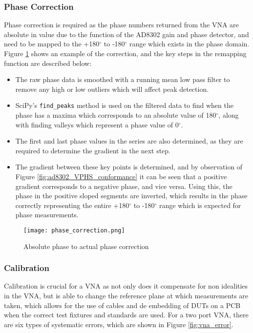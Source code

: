 \subsubsection{Phase Correction}
Phase correction is required as the phase numbers returned from the VNA are absolute in value due to the function of the AD8302 gain and phase detector, and need to be mapped to the +180$^\circ$ to -180$^\circ$ range which exists in the phase domain. Figure \ref{fig:phase_correction} shows an example of the correction, and the key steps in the remapping function are described below:
\begin{itemize}
	\item The raw phase data is smoothed with a running mean low pass filter to remove any high or low outliers which will affect peak detection.
	\item SciPy's \texttt{find\_peaks} method is used on the filtered data to find when the phase has a maxima which corresponds to an absolute value of 180$^\circ$, along with finding valleys which represent a phase value of 0$^\circ$.
	\item The first and last phase values in the series are also determined, as they are required to determine the gradient in the next step. 
	\item The gradient between these key points is determined, and by observation of Figure \ref{fig:ad8302_VPHS_conformance} it can be seen that a positive gradient corresponds to a negative phase, and vice versa. Using this, the phase in the positive sloped segments are inverted, which results in the phase correctly representing the entire +180$^\circ$ to -180$^\circ$ range which is expected for phase measurements. 
\end{itemize} 

\begin{figure}[H]
	\centering
	\texttt{[image: phase\_correction.png]}
	\caption{Absolute phase to actual phase correction}
	\label{fig:phase_correction}
\end{figure}


\subsubsection{Calibration}
Calibration is crucial for a VNA as not only does it compensate for non idealities in the VNA, but is able to change the reference plane at which measurements are taken, which allows for the use of cables and de embedding of DUTs on a PCB when the correct test fixtures and standards are used. For a two port VNA, there are six types of systematic errors, \cite{keysight_vna_cal} which are shown in Figure \ref{fig:vna_error}.

